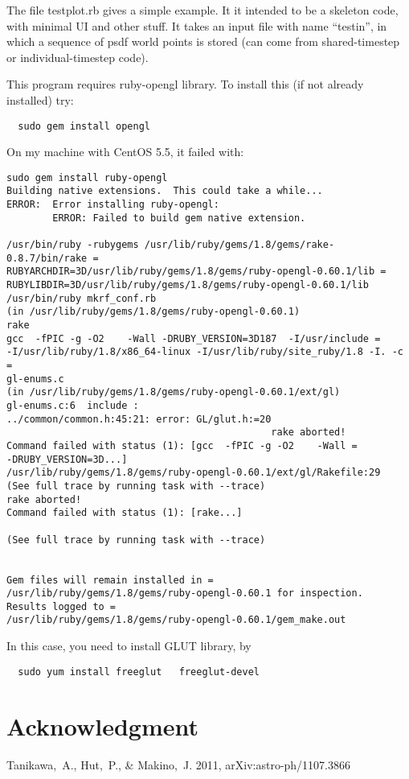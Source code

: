 \documentclass{elsart5p}
\begin{document}
The file testplot.rb gives a simple example. It it intended to be a
skeleton code, with minimal UI and other stuff. It takes an input file
with name ``testin'', in which a sequence of psdf world points is
stored (can come from shared-timestep or individual-timestep code).

This program requires ruby-opengl library. To install this (if not
already installed) try:
\begin{verbatim}
  sudo gem install opengl
\end{verbatim}
On my machine with CentOS 5.5, it failed with:
\begin{verbatim}
sudo gem install ruby-opengl
Building native extensions.  This could take a while...
ERROR:  Error installing ruby-opengl:
        ERROR: Failed to build gem native extension.

/usr/bin/ruby -rubygems /usr/lib/ruby/gems/1.8/gems/rake-0.8.7/bin/rake =
RUBYARCHDIR=3D/usr/lib/ruby/gems/1.8/gems/ruby-opengl-0.60.1/lib =
RUBYLIBDIR=3D/usr/lib/ruby/gems/1.8/gems/ruby-opengl-0.60.1/lib
/usr/bin/ruby mkrf_conf.rb
(in /usr/lib/ruby/gems/1.8/gems/ruby-opengl-0.60.1)
rake
gcc  -fPIC -g -O2    -Wall -DRUBY_VERSION=3D187  -I/usr/include =
-I/usr/lib/ruby/1.8/x86_64-linux -I/usr/lib/ruby/site_ruby/1.8 -I. -c =
gl-enums.c
(in /usr/lib/ruby/gems/1.8/gems/ruby-opengl-0.60.1/ext/gl)
gl-enums.c:6  include :
../common/common.h:45:21: error: GL/glut.h:=20
                                              rake aborted!
Command failed with status (1): [gcc  -fPIC -g -O2    -Wall =
-DRUBY_VERSION=3D...]
/usr/lib/ruby/gems/1.8/gems/ruby-opengl-0.60.1/ext/gl/Rakefile:29
(See full trace by running task with --trace)
rake aborted!
Command failed with status (1): [rake...]

(See full trace by running task with --trace)


Gem files will remain installed in =
/usr/lib/ruby/gems/1.8/gems/ruby-opengl-0.60.1 for inspection.
Results logged to =
/usr/lib/ruby/gems/1.8/gems/ruby-opengl-0.60.1/gem_make.out
\end{verbatim}

In this case, you need to install GLUT library, by
\begin{verbatim}
  sudo yum install freeglut   freeglut-devel
\end{verbatim}

\section*{Acknowledgment}

\begin{thebibliography}{00}
   Tanikawa,~A., Hut,~P.,
    \& Makino,~J. 2011, arXiv:astro-ph/1107.3866
\end{thebibliography}
\end{document}
